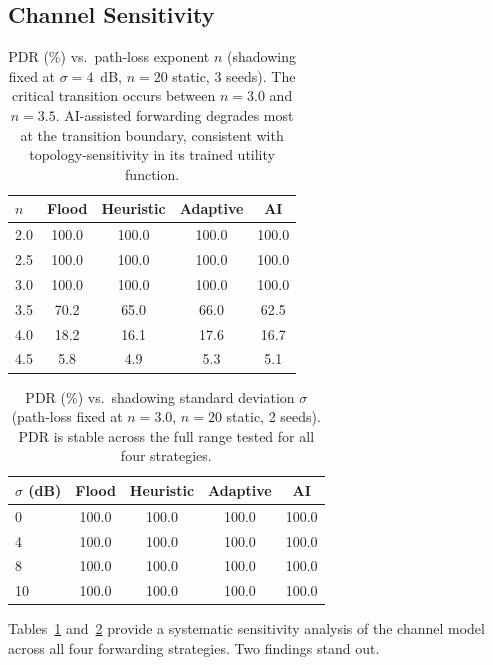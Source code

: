 \documentclass[conference]{IEEEtran}
\begin{document}
\subsection{Channel Sensitivity}

\begin{table}[!t]
  \centering
  \caption{PDR (\%) vs.\ path-loss exponent $n$ (shadowing fixed at
           $\sigma=4$~dB, $n=20$ static, 3 seeds).  The critical transition
           occurs between $n=3.0$ and $n=3.5$.  AI-assisted forwarding degrades most at the transition boundary,
           consistent with topology-sensitivity in its trained utility function.}
  \label{tab:channel_pl}
  \begin{tabular}{lcccc}
    \toprule
    $n$ & \textbf{Flood} & \textbf{Heuristic} & \textbf{Adaptive} & \textbf{AI} \\
    \midrule
    2.0 & 100.0 & 100.0 & 100.0 & 100.0 \\
    2.5 & 100.0 & 100.0 & 100.0 & 100.0 \\
    3.0 & 100.0 & 100.0 & 100.0 & 100.0 \\
    3.5 & 70.2  & 65.0  & 66.0  & 62.5  \\
    4.0 & 18.2  & 16.1  & 17.6  & 16.7  \\
    4.5 &  5.8  &  4.9  &  5.3  &  5.1  \\
    \bottomrule
  \end{tabular}
\end{table}

\begin{table}[!t]
  \centering
  \caption{PDR (\%) vs.\ shadowing standard deviation $\sigma$ (path-loss
           fixed at $n=3.0$, $n=20$ static, 2 seeds).  PDR is stable across
           the full range tested for all four strategies.}
  \label{tab:channel_sh}
  \begin{tabular}{lcccc}
    \toprule
    $\sigma$ (dB) & \textbf{Flood} & \textbf{Heuristic} & \textbf{Adaptive} & \textbf{AI} \\
    \midrule
    0  & 100.0 & 100.0 & 100.0 & 100.0 \\
    4  & 100.0 & 100.0 & 100.0 & 100.0 \\
    8  & 100.0 & 100.0 & 100.0 & 100.0 \\
    10 & 100.0 & 100.0 & 100.0 & 100.0 \\
    \bottomrule
  \end{tabular}
\end{table}

Tables~\ref{tab:channel_pl} and~\ref{tab:channel_sh} provide a systematic
sensitivity analysis of the channel model across all four forwarding strategies.
Two findings stand out.
\end{document}
